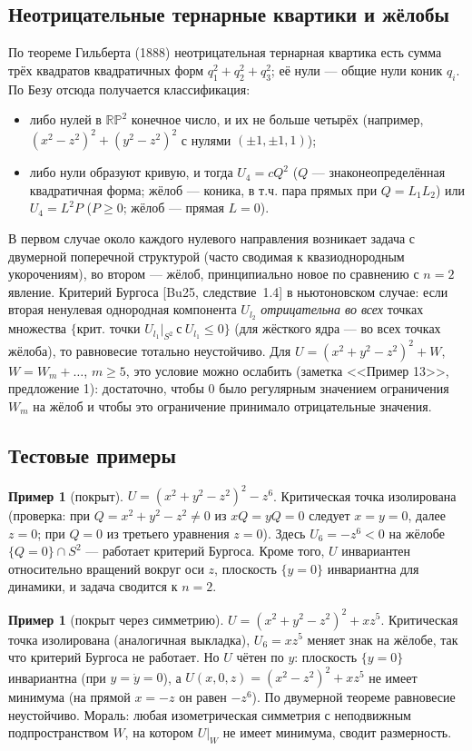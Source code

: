 \documentclass[11pt,a4paper]{article}
\theoremstyle{definition}
\newtheorem{example}[theorem]{Пример}
\begin{document}
\subsection{Неотрицательные тернарные квартики и жёлобы}
По теореме Гильберта (1888) неотрицательная тернарная квартика есть сумма трёх квадратов квадратичных
форм $q_1^2+q_2^2+q_3^2$; её нули --- общие нули коник $q_i$. По Безу отсюда получается классификация:
\begin{itemize}[leftmargin=*]
\item либо нулей в $\mathbb{RP}^2$ конечное число, и их не больше четырёх
(например, $(x^2-z^2)^2+(y^2-z^2)^2$ с нулями $(\pm1,\pm1,1)$);
\item либо нули образуют кривую, и тогда $U_4=cQ^2$ ($Q$ --- знаконеопределённая квадратичная форма;
жёлоб --- коника, в т.ч. пара прямых при $Q=L_1L_2$) или $U_4=L^2P$ ($P\ge0$; жёлоб --- прямая $L=0$).
\end{itemize}
В первом случае около каждого нулевого направления возникает задача с двумерной поперечной структурой
(часто сводимая к квазиоднородным укорочениям), во втором --- жёлоб, принципиально новое по сравнению
с $n=2$ явление. Критерий Бургоса [Bu25, следствие~1.4] в ньютоновском случае: если вторая ненулевая
однородная компонента $U_{l_2}$ \emph{отрицательна во всех} точках множества
$\{\text{крит. точки } U_{l_1}|_{S^2}\ \text{с}\ U_{l_1}\le0\}$ (для жёсткого ядра --- во всех точках жёлоба),
то равновесие тотально неустойчиво. Для $U=(x^2+y^2-z^2)^2+W$, $W=W_m+\dots$, $m\ge5$, это условие можно
ослабить (заметка <<Пример 13>>, предложение 1): достаточно, чтобы $0$ было регулярным значением ограничения
$W_m$ на жёлоб и чтобы это ограничение принимало отрицательные значения.

\subsection{Тестовые примеры}
\begin{example}[покрыт]
$U=(x^2+y^2-z^2)^2-z^6$. Критическая точка изолирована (проверка: при $Q=x^2+y^2-z^2\ne0$ из
$xQ=yQ=0$ следует $x=y=0$, далее $z=0$; при $Q=0$ из третьего уравнения $z=0$). Здесь $U_6=-z^6<0$
на жёлобе $\{Q=0\}\cap S^2$ --- работает критерий Бургоса. Кроме того, $U$ инвариантен относительно
вращений вокруг оси $z$, плоскость $\{y=0\}$ инвариантна для динамики, и задача сводится к $n=2$.
\end{example}

\begin{example}[покрыт через симметрию]
$U=(x^2+y^2-z^2)^2+xz^5$. Критическая точка изолирована (аналогичная выкладка), $U_6=xz^5$ меняет знак на
жёлобе, так что критерий Бургоса не работает. Но $U$ чётен по $y$: плоскость $\{y=0\}$ инвариантна
(при $y=\dot y=0$), а $U(x,0,z)=(x^2-z^2)^2+xz^5$ не имеет минимума (на прямой $x=-z$ он равен $-z^6$).
По двумерной теореме равновесие неустойчиво. Мораль: любая изометрическая симметрия с неподвижным
подпространством $W$, на котором $U|_W$ не имеет минимума, сводит размерность.
\end{example}
\end{document}

